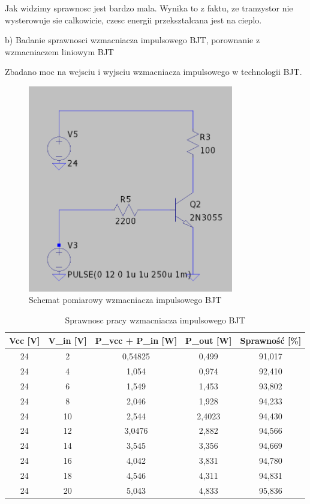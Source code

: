 \documentclass[11pt]{article}
\begin{document}
Jak widzimy sprawnosc jest bardzo mala. Wynika to z faktu, ze tranzystor nie wysterowuje sie calkowicie,
czesc energii przeksztalcana jest na cieplo.

b) Badanie sprawnosci wzmacniacza impulsowego BJT, porownanie z wzmacniaczem liniowym BJT

Zbadano moc na wejsciu i wyjsciu wzmacniacza impulsowego w technologii BJT.\\

\begin{figure}[H]
\centering
\includegraphics[width=0.8\textwidth]{aun1_impulsowy_bjt.png}
\caption{Schemat pomiarowy wzmacniacza impulsowego BJT}
\end{figure}

\begin{table}[H]
\centering
\begin{tabular}{|c|c|c|c|c|}
\hline
\textbf{Vcc [V]} & \textbf{V\_in [V]} & \textbf{P\_vcc + P\_in [W]} & \textbf{P\_out [W]} & \textbf{Sprawność [\%]} \\
\hline
24 & 2  & 0{,}54825 & 0{,}499   & 91{,}017 \\
\hline
24 & 4  & 1{,}054   & 0{,}974   & 92{,}410 \\
\hline
24 & 6  & 1{,}549   & 1{,}453   & 93{,}802 \\
\hline
24 & 8  & 2{,}046   & 1{,}928   & 94{,}233 \\
\hline
24 & 10 & 2{,}544   & 2{,}4023  & 94{,}430 \\
\hline
24 & 12 & 3{,}0476  & 2{,}882   & 94{,}566 \\
\hline
24 & 14 & 3{,}545   & 3{,}356   & 94{,}669 \\
\hline
24 & 16 & 4{,}042   & 3{,}831   & 94{,}780 \\
\hline
24 & 18 & 4{,}546   & 4{,}311   & 94{,}831 \\
\hline
24 & 20 & 5{,}043   & 4{,}833   & 95{,}836 \\
\hline
\end{tabular}
\caption{Sprawnosc pracy wzmacniacza impulsowego BJT}
\end{table}
\end{document}
